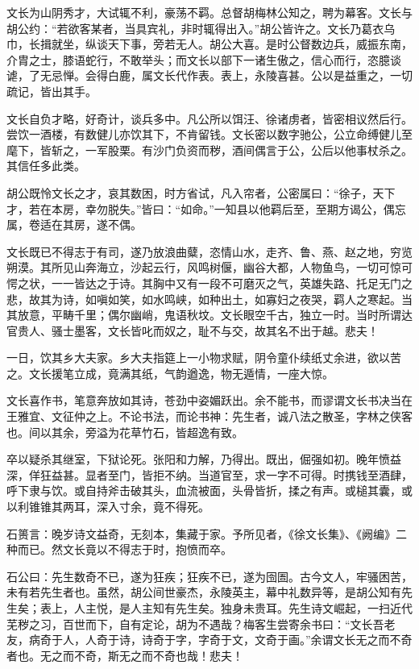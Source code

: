 \documentclass[UTF8,titlepage,oneside]{ctexbook}
\begin{document}
文长为山阴秀才，大试辄不利，豪荡不羁。总督胡梅林公知之，聘为幕客。文长与胡公约：“若欲客某者，当具宾礼，非时辄得出入。”胡公皆许之。文长乃葛衣乌巾，长揖就坐，纵谈天下事，旁若无人。胡公大喜。是时公督数边兵，威振东南，介胄之士，膝语蛇行，不敢举头；而文长以部下一诸生傲之，信心而行，恣臆谈谑，了无忌惮。会得白鹿，属文长代作表。表上，永陵喜甚。公以是益重之，一切疏记，皆出其手。


文长自负才略，好奇计，谈兵多中。凡公所以饵汪、徐诸虏者，皆密相议然后行。尝饮一酒楼，有数健儿亦饮其下，不肯留钱。文长密以数字驰公，公立命缚健儿至麾下，皆斩之，一军股栗。有沙门负资而秽，酒间偶言于公，公后以他事杖杀之。其信任多此类。


胡公既怜文长之才，哀其数困，时方省试，凡入帘者，公密属曰：“徐子，天下才，若在本房，幸勿脱失。”皆曰：“如命。”一知县以他羁后至，至期方谒公，偶忘属，卷适在其房，遂不偶。


文长既已不得志于有司，遂乃放浪曲糵，恣情山水，走齐、鲁、燕、赵之地，穷览朔漠。其所见山奔海立，沙起云行，风鸣树偃，幽谷大都，人物鱼鸟，一切可惊可愕之状，一一皆达之于诗。其胸中又有一段不可磨灭之气，英雄失路、托足无门之悲，故其为诗，如嗔如笑，如水鸣峡，如种出土，如寡妇之夜哭，羁人之寒起。当其放意，平畴千里；偶尔幽峭，鬼语秋坟。文长眼空千古，独立一时。当时所谓达官贵人、骚士墨客，文长皆叱而奴之，耻不与交，故其名不出于越。悲夫！


一日，饮其乡大夫家。乡大夫指筵上一小物求赋，阴令童仆续纸丈余进，欲以苦之。文长援笔立成，竟满其纸，气韵遒逸，物无遁情，一座大惊。


文长喜作书，笔意奔放如其诗，苍劲中姿媚跃出。余不能书，而谬谓文长书决当在王雅宜、文征仲之上。不论书法，而论书神：先生者，诚八法之散圣，字林之侠客也。间以其余，旁溢为花草竹石，皆超逸有致。


卒以疑杀其继室，下狱论死。张阳和力解，乃得出。既出，倔强如初。晚年愤益深，佯狂益甚。显者至门，皆拒不纳。当道官至，求一字不可得。时携钱至酒肆，呼下隶与饮。或自持斧击破其头，血流被面，头骨皆折，揉之有声。或槌其囊，或以利锥锥其两耳，深入寸余，竟不得死。


石篑言：晚岁诗文益奇，无刻本，集藏于家。予所见者，《徐文长集》、《阙编》二种而已。然文长竟以不得志于时，抱愤而卒。


石公曰：先生数奇不已，遂为狂疾；狂疾不已，遂为囹圄。古今文人，牢骚困苦，未有若先生者也。虽然，胡公间世豪杰，永陵英主，幕中礼数异等，是胡公知有先生矣；表上，人主悦，是人主知有先生矣。独身未贵耳。先生诗文崛起，一扫近代芜秽之习，百世而下，自有定论，胡为不遇哉？梅客生尝寄余书曰：“文长吾老友，病奇于人，人奇于诗，诗奇于字，字奇于文，文奇于画。”余谓文长无之而不奇者也。无之而不奇，斯无之而不奇也哉！悲夫！
\end{document}
